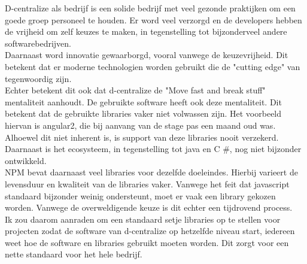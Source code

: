 D-centralize als bedrijf is een solide bedrijf met veel gezonde praktijken om een goede groep personeel te houden. Er word veel verzorgd en de developers hebben de vrijheid om zelf keuzes te maken, in tegenstelling tot bijzonderveel andere softwarebedrijven. \\

Daarnaast word innovatie gewaarborgd, vooral vanwege de keuzevrijheid. Dit betekent dat er moderne technologien worden gebruikt die de "cutting edge" van tegenwoordig zijn. \\

Echter betekent dit ook dat d-centralize de "Move fast and break stuff" mentaliteit aanhoudt. De gebruikte software heeft ook deze mentaliteit. Dit betekent dat de gebruikte libraries vaker niet volwassen zijn. Het voorbeeld hiervan is angular2, die bij aanvang van de stage pas een maand oud was. \\

Alhoewel dit niet inherent is, is support van deze libraries nooit verzekerd. Daarnaast is het ecosysteem, in tegenstelling tot java en C	\#, nog niet bijzonder ontwikkeld. \\

NPM bevat daarnaast veel libraries voor dezelfde doeleindes. Hierbij varieert de levensduur en kwaliteit van de libraries vaker. Vanwege het feit dat javascript standaard bijzonder weinig ondersteunt, moet er vaak een library gekozen worden. Vanwege de overweldigende keuze is dit echter een tijdrovend process. \\

Ik zou daarom aanraden om een standaard setje libraries op te stellen voor projecten zodat de software van d-centralize op hetzelfde niveau start, iedereen weet hoe de software en libraries gebruikt moeten worden. Dit zorgt voor een nette standaard voor het hele bedrijf. \\